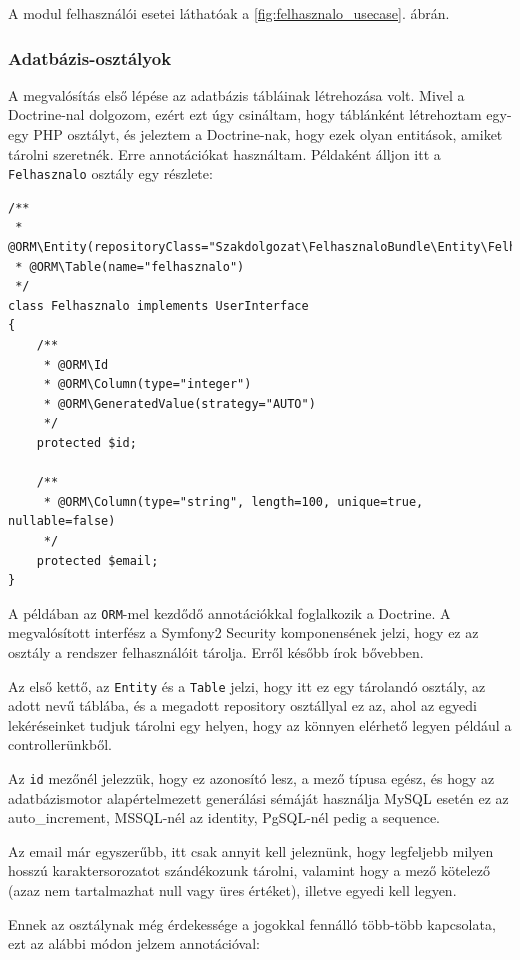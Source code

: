 \documentclass[a4paper,12pt,oneside]{report}
\begin{document}
A modul felhasználói esetei láthatóak a \ref{fig:felhasznalo_usecase}. ábrán.

\subsubsection*{Adatbázis-osztályok}

A megvalósítás első lépése az adatbázis tábláinak létrehozása volt. Mivel a Doctrine-nal dolgozom, ezért ezt úgy csináltam, hogy táblánként létrehoztam egy-egy PHP osztályt, és jeleztem a Doctrine-nak, hogy ezek olyan entitások, amiket tárolni szeretnék. Erre annotációkat használtam. Példaként álljon itt a {\tt Felhasznalo} osztály egy részlete:

\begin{lstlisting}
/**
 * @ORM\Entity(repositoryClass="Szakdolgozat\FelhasznaloBundle\Entity\FelhasznaloRepository")
 * @ORM\Table(name="felhasznalo")
 */
class Felhasznalo implements UserInterface
{
    /**
     * @ORM\Id
     * @ORM\Column(type="integer")
     * @ORM\GeneratedValue(strategy="AUTO")
     */
    protected $id;

    /**
     * @ORM\Column(type="string", length=100, unique=true, nullable=false)
     */
    protected $email;
}
\end{lstlisting}

A példában az {\tt ORM}-mel kezdődő annotációkkal foglalkozik a Doctrine. A megvalósított interfész a Symfony2 Security komponensének jelzi, hogy ez az osztály a rendszer felhasználóit tárolja. Erről később írok bővebben.

Az első kettő, az {\tt Entity} és a {\tt Table} jelzi, hogy itt ez egy tárolandó osztály, az adott nevű táblába, és a megadott repository osztállyal \textendash{} ez az, ahol az egyedi lekéréseinket tudjuk tárolni egy helyen, hogy az könnyen elérhető legyen például a controllerünkből.

Az {\tt id} mezőnél jelezzük, hogy ez azonosító lesz, a mező típusa egész, és hogy az adatbázismotor alapértelmezett generálási sémáját használja \textendash{} MySQL esetén ez az auto\_increment, MSSQL-nél az identity, PgSQL-nél pedig a sequence.

Az email már egyszerűbb, itt csak annyit kell jeleznünk, hogy legfeljebb milyen hosszú karaktersorozatot szándékozunk tárolni, valamint hogy a mező kötelező (azaz nem tartalmazhat null vagy üres értéket), illetve egyedi kell legyen.

Ennek az osztálynak még érdekessége a jogokkal fennálló több-több kapcsolata, ezt az alábbi módon jelzem annotációval:
\end{document}
